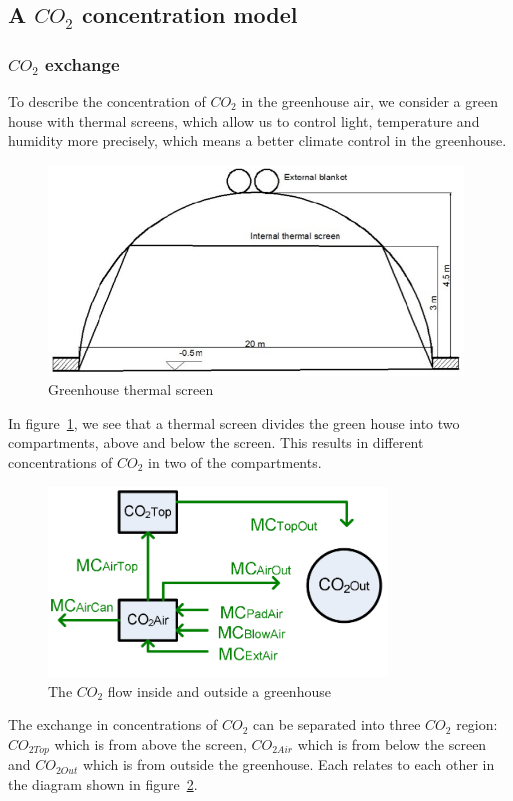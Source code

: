 \documentclass[a4paper]{article}
\begin{document}
\subsection{A \texorpdfstring{\(CO_2\)}{} concentration model}
\subsubsection{\texorpdfstring{\(CO_2\)}{} exchange}
To describe the concentration of \(CO_2\) in the greenhouse air, we consider a green house with thermal screens, which allow us to control light, temperature and humidity more precisely, which means a better climate control in the greenhouse.
\begin{figure}[H]
  \centering
  \includegraphics[width=11cm]{thrscr.png}
  \caption{Greenhouse thermal screen}\label{fig:thrscr}
\end{figure}

In figure~\ref{fig:thrscr}, we see that a thermal screen divides the green house into two compartments, above and below the screen.
This results in different concentrations of \(CO_2\) in two of the compartments.
\begin{figure}[H]
  \centering
  \includegraphics[width=9cm]{CO2}
  \caption{The \(CO_2\) flow inside and outside a greenhouse}\label{fig:CO2}
\end{figure}

The exchange in concentrations of \(CO_2\) can be separated into three \(CO_2\) region: \(CO_{2Top}\) which is from above the screen, \(CO_{2Air}\) which is from below the screen and \(CO_{2Out}\) which is from outside the greenhouse.
Each relates to each other in the diagram shown in figure~\ref{fig:CO2}.
\end{document}
